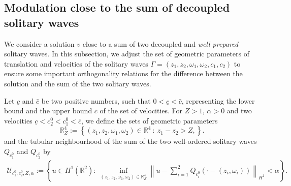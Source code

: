 \documentclass[reqno,10pt]{amsart}
\numberwithin{equation}{section}
\begin{document}
	\subsection{Modulation close to the sum of decoupled solitary waves}
	
	We consider a solution $v$ close to a sum of two decoupled and \emph{well prepared} solitary waves. In this subsection, we adjust the set of geometric parameters of translation and velocities of the solitary waves $\Gamma=\left(z_1,z_2,\omega_1,\omega_2,c_1,c_2\right)$ to ensure some important orthogonality relations for the difference between the solution and the sum of the two solitary waves. 
	
	Let $\underline{c}$ and $\bar{c}$ be two positive numbers, such that $0<\underline{c}<\bar{c}$, representing the lower bound and the upper bound $\bar{c}$ of the set of velocities.
	For $Z>1$, $\alpha>0$ and two velocities $\underline{c}<c_2^0<c_1^0<\bar{c}$, we define the sets of geometric parameters
	\begin{equation}\label{defi:Xi}
		\mathbb R^{4}_Z:= \left\{ (z_1, z_2,\omega_1, \omega_2) \in \mathbb{R}^4  \ : \ z_{1}-z_2 > Z,  \right\}.
	\end{equation}
	and the tubular neighbourhood of the sum of the two well-ordered solitary waves $Q_{c_1^0}$ and $Q_{c_2^0}$ by
	\begin{align} \label{def:tub}
		\mathcal{U}_{c_1^0, c_2^0, Z, \alpha} := \left\{ u \in H^1 (\mathbb{R}^2) : \ \inf_{(z_1,z_2,\omega_1,\omega_2) \in \mathbb R^4_Z} \left\| u - \sum_{i=1}^2 Q_{c_i^0} \left( \cdot - (z_i,\omega_i) \right) \right\|_{H^1} < \alpha \right\}.
	\end{align}
	
\end{document}
